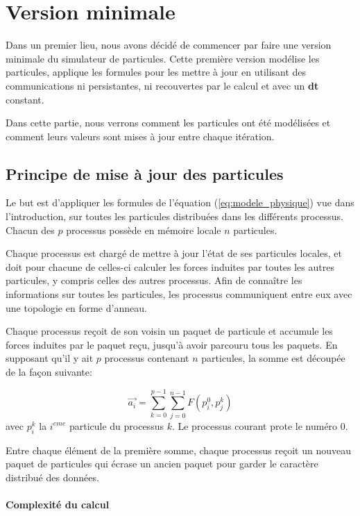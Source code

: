 \section{Version minimale}

Dans un premier lieu, nous avons décidé de commencer par faire une version minimale du simulateur de particules. Cette première version modélise les particules, applique les formules pour les mettre à jour en utilisant des communications ni persistantes, ni recouvertes par le calcul et avec un \textbf{dt} constant.

Dans cette partie, nous verrons comment les particules ont été modélisées et comment leurs valeurs sont mises à jour entre chaque itération.

\subsection{Principe de mise à jour des particules}

Le but est d'appliquer les formules de l'équation (\ref{eq:modele_physique}) vue dans l'introduction, sur toutes les particules distribuées dans les différents processus. Chacun des $p$ processus possède en mémoire locale $n$ particules.

Chaque processus est chargé de mettre à jour l'état de ses particules locales, et doit pour chacune de celles-ci calculer les forces induites par toutes les autres particules, y compris celles des autres processus. Afin de connaître les informations sur toutes les particules, les processus communiquent entre eux avec une topologie en forme d'anneau.

Chaque processus reçoit de son voisin un paquet de particule et accumule les forces induites par le paquet reçu, jusqu'à avoir parcouru tous les paquets. En supposant qu'il y ait $p$ processus contenant $n$ particules, la somme est découpée de la façon suivante:

\begin{equation}
      \overrightarrow{a_i} = \sum_{k=0}^{p-1}{\sum_{j=0}^{n-1}{F(p_i^0,p_j^k)}} 
\label{eq:accel_paquets}
\end{equation}
avec $p_i^k$ la $i^{eme}$ particule du processus $k$. Le processus courant prote le numéro $0$.

Entre chaque élément de la première somme, chaque processus reçoit un nouveau paquet de particules qui écrase un ancien paquet pour garder le caractère distribué des données.

\paragraph{Complexité du calcul}

